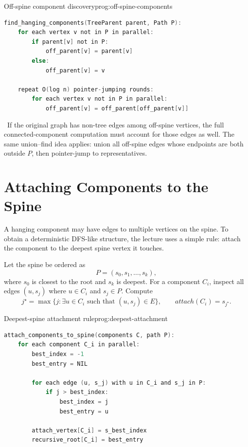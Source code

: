 \begin{ppprogram}{Off-spine component discovery}{prog:off-spine-components}
\begin{lstlisting}[language=C]
find_hanging_components(TreeParent parent, Path P):
    for each vertex v not in P in parallel:
        if parent[v] not in P:
            off_parent[v] = parent[v]
        else:
            off_parent[v] = v

    repeat O(log n) pointer-jumping rounds:
        for each vertex v not in P in parallel:
            off_parent[v] = off_parent[off_parent[v]]
\end{lstlisting}
\end{ppprogram}

\begin{ppnote}
\ If the original graph has non-tree edges among off-spine vertices, the full connected-component computation must account for those edges as well.
The same union--find idea applies: union all off-spine edges whose endpoints are both outside \(P\), then pointer-jump to representatives.
\end{ppnote}

\section{Attaching Components to the Spine}
\label{sec:attach-components}

A hanging component may have edges to multiple vertices on the spine.
To obtain a deterministic DFS-like structure, the lecture uses a simple rule:
attach the component to the deepest spine vertex it touches.

Let the spine be ordered as
\[
    P = (s_0, s_1, \ldots, s_k),
\]
where \(s_0\) is closest to the root and \(s_k\) is deepest.
For a component \(C_i\), inspect all edges \((u,s_j)\) where \(u \in C_i\) and \(s_j \in P\).
Compute
\[
    j^\star = \max \{j : \exists u \in C_i \text{ such that } (u,s_j) \in E\},
    \qquad
    attach(C_i) = s_{j^\star}.
\]

\begin{ppprogram}{Deepest-spine attachment rule}{prog:deepest-attachment}
\begin{lstlisting}[language=C]
attach_components_to_spine(components C, path P):
    for each component C_i in parallel:
        best_index = -1
        best_entry = NIL

        for each edge (u, s_j) with u in C_i and s_j in P:
            if j > best_index:
                best_index = j
                best_entry = u

        attach_vertex[C_i] = s_best_index
        recursive_root[C_i] = best_entry
\end{lstlisting}
\end{ppprogram}

